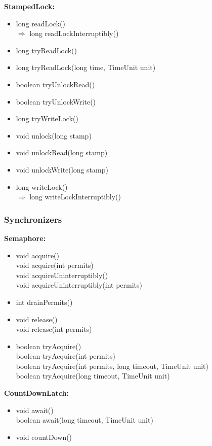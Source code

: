 \documentclass[]{usiinfthesis}
\begin{document}
{\noindent
\textbf{StampedLock:}
\begin{itemize}
    \item   long readLock()
    \mbox{}\\ $\Rightarrow$ long readLockInterruptibly()
    \item   long tryReadLock()
    \item   long tryReadLock(long time, TimeUnit unit)
    \item   boolean tryUnlockRead()
    \item   boolean tryUnlockWrite()
    \item   long tryWriteLock()
    \item   void unlock(long stamp)
    \item   void unlockRead(long stamp)
    \item   void unlockWrite(long stamp)
    \item   long writeLock()
    \mbox{}\\ $\Rightarrow$ long writeLockInterruptibly()
\end{itemize}


\subsubsection{Synchronizers}

\noindent
\textbf{Semaphore:}
\begin{itemize}
    \item   void acquire()
    \mbox{}\\ void acquire(int permits)
    \mbox{}\\ void acquireUninterruptibly()
    \mbox{}\\ void acquireUninterruptibly(int permits)
    \item   int drainPermits()
    \item   void release()
    \mbox{}\\ void release(int permits)
    \item   boolean tryAcquire()
    \mbox{}\\ boolean tryAcquire(int permits)
    \mbox{}\\ boolean tryAcquire(int permits, long timeout, TimeUnit unit)
    \mbox{}\\ boolean tryAcquire(long timeout, TimeUnit unit)
\end{itemize}

\noindent
\textbf{CountDownLatch:}
\begin{itemize}
    \item   void await()
    \mbox{}\\ boolean await(long timeout, TimeUnit unit)
    \item   void countDown()
\end{itemize}

}
\end{document}
